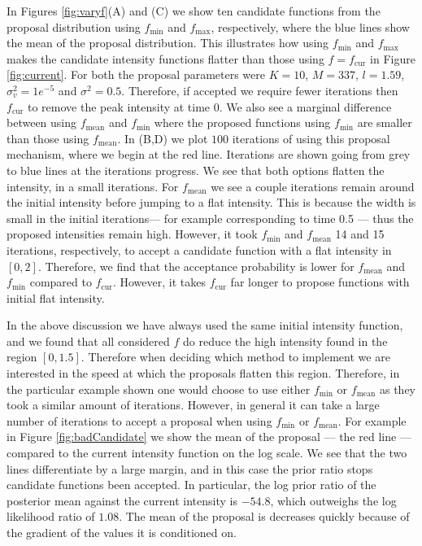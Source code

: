 \documentclass[oneside, 12 pt]{book}
\begin{document}
  In Figures \ref{fig:varyf}(A) and (C) we show ten candidate functions from the proposal distribution using $f_{\mathrm{min}}$ and $f_{\mathrm{max}}$, respectively, where the blue lines show the mean of the proposal distribution. This illustrates how using $f_{\mathrm{min}}$ and $f_{\mathrm{max}}$ makes the candidate intensity functions flatter than those using $f = f_{\mathrm{cur}}$ in Figure \ref{fig:current}. For both the proposal parameters were $K=10$, $M=337$, $l = 1.59$, $\sigma_v^2 = 1e^{-5}$ and $\sigma^2 = 0.5$. Therefore, if accepted we require fewer iterations then $f_{\mathrm{cur}}$ to remove the peak intensity at time $0$. We also see a marginal difference between using $f_{\mathrm{mean}}$ and $f_{\mathrm{min}}$ where the proposed functions using $f_{\mathrm{min}}$ are smaller than those using $f_{\mathrm{mean}}$. In (B,D) we plot $100$ iterations of using this proposal mechanism, where we begin at the red line. Iterations are shown going from grey to blue lines at the iterations progress. We see that both options flatten the intensity, in a small iterations. For $f_{\mathrm{mean}}$ we see a couple iterations remain around the initial intensity before jumping to a flat intensity. This is because the width is small in the initial iterations--- for example corresponding to time 0.5 --- thus the proposed intensities remain high. However, it took $f_{\mathrm{min}}$ and $f_{\mathrm{mean}}$ 14 and 15 iterations, respectively, to accept a candidate function with a flat intensity in $[0,2]$. Therefore, we find that the acceptance probability is lower for $f_{\mathrm{mean}}$ and $f_{\mathrm{min}}$ compared to $f_{\mathrm{cur}}$. However, it takes $f_{\mathrm{cur}}$ far longer to propose functions with initial flat intensity. 
  
  In the above discussion we have always used the same initial intensity function, and we found that all considered $f$ do reduce the high intensity found in the region $[0,1.5]$. Therefore when deciding which method to implement we are interested in the speed at which the proposals flatten this region. Therefore, in the particular example shown one would choose to use either $f_{\mathrm{min}}$ or $f_{\mathrm{mean}}$ as they took a similar amount of iterations. However, in general it can take a large number of iterations to accept a proposal when using $f_{\mathrm{min}}$ or $f_{\mathrm{mean}}$. For example in Figure \ref{fig:badCandidate} we show the mean of the proposal --- the red line --- compared to the current intensity function on the log scale. We see that the two lines differentiate by a large margin, and in this case the prior ratio stops candidate functions been accepted. In particular, the log prior ratio of the posterior mean against the current intensity is $-54.8$, which outweighs the log likelihood ratio of $1.08$. The mean of the proposal is decreases quickly because of the gradient of the values it is conditioned on.
  
\end{document}
